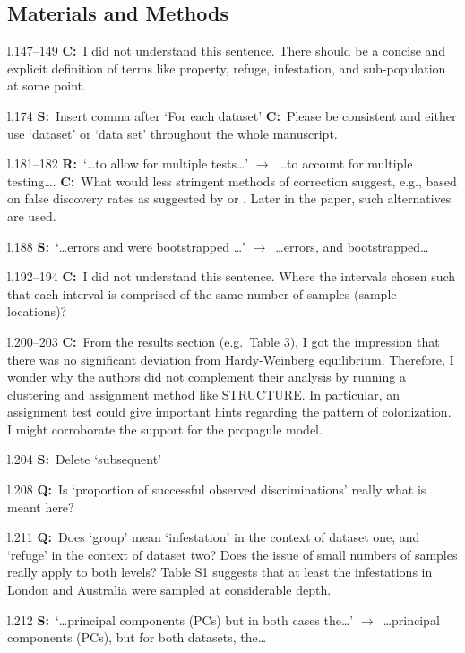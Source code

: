 \documentclass[11pt]{article}
\newenvironment{my_description}
{\begin{description}
  \setlength{\itemsep}{2pt}
  \setlength{\parskip}{0pt}
  \setlength{\parsep}{0pt}}
{\end{description}}
\newcommand{\ra}{$\rightarrow$\ }
\newcommand{\C}{\textbf{C:}\ }
\newcommand{\Q}{\textbf{Q:}\ }
\newcommand{\R}{\textbf{R:}\ }
\newcommand{\V}{\textbf{S:}\ }
\begin{document}
\subsection{Materials and Methods}

\begin{my_description}
	\item[l.147--149] \C I did not understand this sentence. There should be a concise and explicit definition of terms like property, refuge, infestation, and sub-population at some point.
	\item[l.174] \V Insert comma after `For each dataset' \C Please be consistent and either use `dataset' or `data set' throughout the whole manuscript.
	\item[l.181--182] \R `\dots to allow for multiple tests\dots' \ra \dots to account for multiple testing\dots. \C What would less stringent methods of correction suggest, e.g., based on false discovery rates as suggested by \citet{Benjamini:2001uq} or \citet{Benjamini:1995fk}. Later in the paper, such alternatives are used.
	\item[l.188] \V `\dots errors and were bootstrapped \dots' \ra \dots errors, and bootstrapped\dots
	\item[l.192--194] \C I did not understand this sentence. Where the intervals chosen such that each interval is comprised of the same number of samples (sample locations)?
	\item[l.200--203] \C From the results section (e.g.\ Table 3), I got the impression that there was no significant deviation from Hardy-Weinberg equilibrium. Therefore, I wonder why the authors did not complement their analysis by running a clustering and assignment method like STRUCTURE. In particular, an assignment test could give important hints regarding the pattern of colonization. I might corroborate the support for the propagule model.
	\item[l.204] \V Delete `subsequent'
	\item[l.208] \Q Is `proportion of successful observed discriminations' really what is meant here?
	\item[l.211] \Q Does `group' mean `infestation' in the context of dataset one, and `refuge' in the context of dataset two? Does the issue of small numbers of samples really apply to both levels? Table S1 suggests that at least the infestations in London and Australia were sampled at considerable depth.
	\item[l.212] \V `\dots principal components (PCs) but in both cases the\dots' \ra \dots principal components (PCs), but for both datasets, the\dots

\end{my_description}
\end{document}
